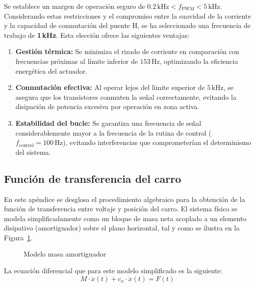 \documentclass[11pt,fleqn]{book} %
\begin{document}
Se establece un margen de operación seguro de $0.2\,\text{kHz} < f_{\text{PWM}} < 5\,\text{kHz}$. Considerando estas restricciones y el compromiso entre la suavidad de la corriente y la capacidad de conmutación del puente H, se ha seleccionado una frecuencia de trabajo de \textbf{1\,kHz}. Esta elección ofrece las siguientes ventajas:

\begin{enumerate}
	\item \textbf{Gestión térmica:} Se minimiza el rizado de corriente en comparación con frecuencias próximas al límite inferior de $153\,\text{Hz}$, optimizando la eficiencia energética del actuador.
	
	\item \textbf{Conmutación efectiva:} Al operar lejos del límite superior de $5\,\text{kHz}$, se asegura que los transistores conmuten la señal correctamente, evitando la disipación de potencia excesiva por operación en zona activa.
	
	\item \textbf{Estabilidad del bucle:} Se garantiza una frecuencia de señal considerablemente mayor a la frecuencia de la rutina de control ($f_{\text{control}} = 100\,\text{Hz}$), evitando interferencias que comprometerían el determinismo del sistema.
\end{enumerate}

\newpage
\subsection{Función de transferencia del carro}
\label{ap:desarrollo_bloques_carro}

En este apéndice se desglosa el procedimiento algebraico para la obtención de la función de transferencia entre voltaje y posición del carro. El sistema físico se modela simplificadamente como un bloque de masa neta acoplado a un elemento disipativo  (amortiguador) sobre el plano horizontal, tal y como se ilustra en la Figura~\ref{fig:esquema_masa_amortiguador}.
\begin{figure}[htbp]
	\centering
	\resizebox{0.7\textwidth}{!}{
	}
	\caption{Modelo masa amortiguador}
	\label{fig:esquema_masa_amortiguador}
\end{figure}
\FloatBarrier

La ecuación diferencial que para este modelo simplificado es la siguiente:
\begin{equation}
	M \cdot \ddot{x}(t) + c_x \cdot \dot{x}(t) = F(t)
\end{equation}
\end{document}
